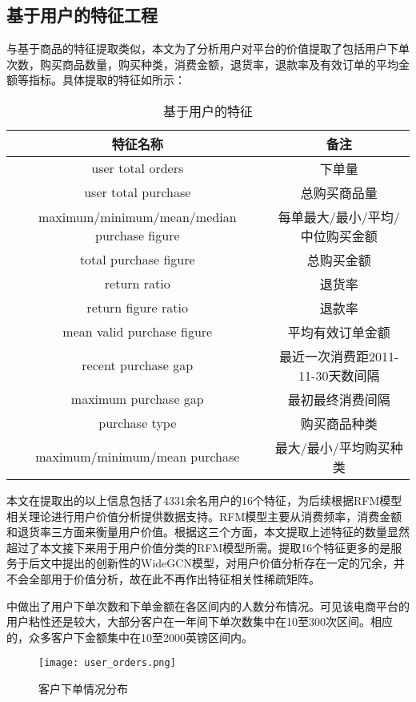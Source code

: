 \documentclass[lang=cn,11pt,a4paper,cite=authoryear]{elegantpaper}
\begin{document}
\subsection{基于用户的特征工程}
与基于商品的特征提取类似，本文为了分析用户对平台的价值提取了包括用户下单次数，购买商品数量，购买种类，消费金额，退货率，退款率及有效订单的平均金额等指标。具体提取的特征如所示：
\begin{center}
\begin{longtable}{c|c}
    \caption{基于用户的特征}
    \label{基于用户的特征}\\
    \hline
      \textbf{特征名称} & \textbf{备注} \\
      \hline
      user total orders  & 下单量 \\
      user total purchase  & 总购买商品量 \\
      maximum/minimum/mean/median purchase figure & 每单最大/最小/平均/中位购买金额  \\
      total purchase figure   & 总购买金额 \\
      return ratio & 退货率 \\
      return figure ratio & 退款率 \\
      mean valid purchase figure & 平均有效订单金额 \\
      recent purchase gap & 最近一次消费距2011-11-30天数间隔 \\
      maximum purchase gap & 最初最终消费间隔 \\
      purchase type & 购买商品种类 \\
      maximum/minimum/mean purchase  & 最大/最小/平均购买种类 \\
      \hline
  \end{longtable}
\end{center}

本文在提取出的以上信息包括了4331余名用户的16个特征，为后续根据RFM模型相关理论进行用户价值分析提供数据支持。RFM模型主要从消费频率，消费金额和退货率三方面来衡量用户价值。根据这三个方面，本文提取上述特征的数量显然超过了本文接下来用于用户价值分类的RFM模型所需。提取16个特征更多的是服务于后文中提出的创新性的WideGCN模型，对用户价值分析存在一定的冗余，并不会全部用于价值分析，故在此不再作出特征相关性稀疏矩阵。

中做出了用户下单次数和下单金额在各区间内的人数分布情况。可见该电商平台的用户粘性还是较大，大部分客户在一年间下单次数集中在10至300次区间。相应的，众多客户下金额集中在10至2000英镑区间内。
\begin{figure}[H]
  \centering
  \texttt{[image: user\_orders.png]}
  \caption{客户下单情况分布}
  \label{客户下单情况分布}
\end{figure}
\end{document}
